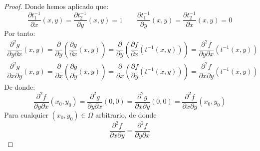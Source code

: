 \begin{teo}[de Clairaut]
\begin{proof}
        Donde hemos aplicado que:
        \begin{equation*}
            \dfrac{\partial t_1^{-1}}{\partial x}(x,y) = \dfrac{\partial t_2^{-1}}{\partial y}(x,y) = 1 \qquad \dfrac{\partial t_1^{-1}}{\partial y}(x,y) = \dfrac{\partial t_2^{-1}}{\partial x}(x,y) = 0 
        \end{equation*}
        Por tanto:
        \begin{gather*}
            \dfrac{\partial^2 g}{\partial y\partial x}(x,y) = \dfrac{\partial }{\partial y}\left(\dfrac{\partial g}{\partial x}(x,y)\right) = \dfrac{\partial }{\partial y}\left(\dfrac{\partial f}{\partial x}(t^{-1}(x,y))\right) = \dfrac{\partial^2 f}{\partial y\partial x}(t^{-1}(x,y)) \\
            \dfrac{\partial^2 g}{\partial x\partial y}(x,y) = \dfrac{\partial }{\partial x}\left(\dfrac{\partial g}{\partial y}(x,y)\right) = \dfrac{\partial }{\partial x}\left(\dfrac{\partial f}{\partial y}(t^{-1}(x,y))\right) = \dfrac{\partial^2 f}{\partial x\partial y}(t^{-1}(x,y)) 
        \end{gather*}
        De donde:
        \begin{equation*}
            \dfrac{\partial^2 f}{\partial y\partial x}(x_0,y_0) = \dfrac{\partial^2 g}{\partial y\partial x}(0,0) = \dfrac{\partial^2 g}{\partial x\partial y}(0,0) = \dfrac{\partial^2 f}{\partial x\partial y}(x_0, y_0)
        \end{equation*}
        Para cualquier $(x_0,y_0)\in \Omega$ arbitrario, de donde
        \begin{equation*}
            \dfrac{\partial^2 f}{\partial x\partial y} = \dfrac{\partial^2 f}{\partial y\partial x} 
        \end{equation*}
    \end{proof}
\end{teo}

